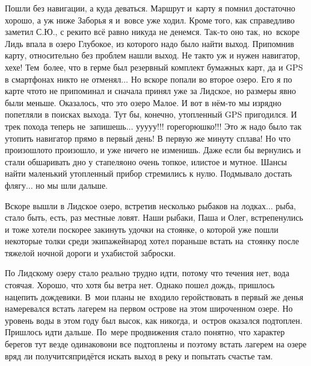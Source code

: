 Пошли без навигации, а куда деваться. Маршрут и~карту я помнил достаточно хорошо, а уж ниже Заборья я и~вовсе уже ходил. Кроме того, как справедливо заметил С.Ю., с реки\sdash то всё равно никуда не денемся. Так-то оно так, но~вскоре Лидь впала в озеро Глубокое, из которого надо было найти выход. Припомнив карту, относительно без проблем нашли выход. Не так\sdash то уж и нужен навигатор, хе\sdash хе! Тем~более, что в герме был резервный комплект бумажных карт, да и GPS в смартфонах никто не отменял$\ldots$ Но вскоре попали во второе озеро. Его я по карте что\sdash то не припоминал и сначала принял уже за Лидское, но размеры явно были меньше. Оказалось, что это озеро Малое. И вот в нём-то мы изрядно попетляли в поисках выхода. Тут бы, конечно, утопленный GPS пригодился. И трек похода теперь не~запишешь$\ldots$ у\sdash у\sdash у\sdash у\sdash у!!! горе\sdash горюшко!!! Это ж надо было так утопить навигатор прямо в первый день! В первую же минуту сплава! Но что произошло\mdash то произошло, и уже ничего не изменишь. Даже если бы вернулись и стали обшаривать дно у стапеля\mdash оно очень топкое, илистое и мутное. Шансы найти маленький утопленный прибор стремились к нулю. Подмывало достать флягу$\ldots$ но мы шли дальше.

Вскоре вышли в Лидское озеро, встретив несколько рыбаков на лодках$\ldots$ рыба, стало быть, есть, раз местные ловят. Наши рыбаки, Паша и Олег, встрепенулись и тоже хотели поскорее закинуть удочки на стоянке, о которой уже пошли некоторые толки среди экипажей\mdash народ хотел пораньше встать на~стоянку после тяжелой ночной дороги и ухабистой заброски. 

По Лидскому озеру стало реально трудно идти, потому что течения нет, вода стоячая. Хорошо, что хотя бы ветра нет. Однако пошел дождь, пришлось нацепить дождевики. В~мои планы не~входило геройствовать в первый же день\mdash я намеревался встать лагерем на первом острове на этом широченном озере. Но уровень воды в этом году был высок, как никогда, и~остров оказался подтоплен. Пришлось идти дальше. По~мере продвижения стало понятно, что характер берегов тут везде одинаков\mdash они все подтоплены и поэтому встать лагерем на озере вряд ли получится\mdash придётся искать выход в реку и попытать счастье там. 

